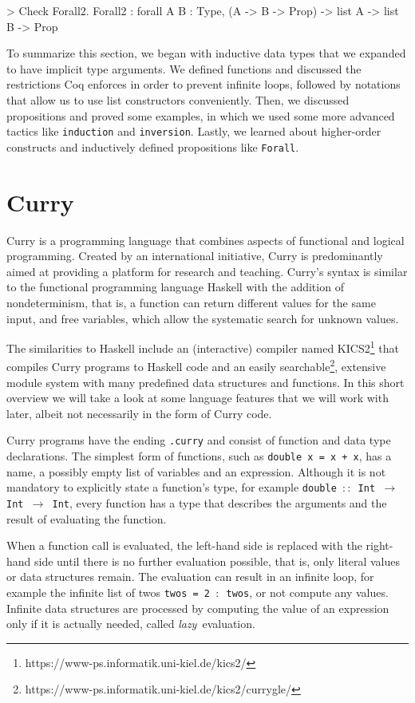 \documentclass[paper = a4, fleqn, abstract=on, twoside]{scrreprt}
\newcommand{\coqinline}[1]{\texttt{#1}}
\begin{document}
\begin{coqcode}
> Check Forall2.
Forall2 : forall A B : Type, (A -> B -> Prop) -> list A -> list B -> Prop
\end{coqcode}
To summarize this section, we began with inductive data types that we expanded to have implicit type arguments. We defined functions and discussed the restrictions Coq enforces in order to prevent infinite loops, followed by notations that allow us to use list constructors conveniently. Then, we discussed propositions and proved some examples, in which we used some more advanced tactics like \coqinline{induction} and \coqinline{inversion}. Lastly, we learned about higher-order constructs and inductively defined propositions like \coqinline{Forall}.
\section{Curry}
Curry\citet{report} is a programming language that combines aspects of functional and logical programming. Created by an international initiative, Curry is predominantly aimed at providing a platform for research and teaching. Curry's syntax is similar to the functional programming language Haskell with the addition of nondeterminism, that is, a function can return different values for the same input, and free variables, which allow the systematic search for unknown values.
\par
The similarities to Haskell include an (interactive) compiler named KICS2\footnote{https://www-ps.informatik.uni-kiel.de/kics2/} that compiles Curry programs to Haskell code and  an easily searchable\footnote{https://www-ps.informatik.uni-kiel.de/kics2/currygle/}, extensive module system with many predefined data structures and functions. In this short overview we will take a look at some language features that we will work with later, albeit not necessarily in the form of Curry code.\\
\par\noindent
Curry programs have the ending \texttt{.curry} and consist of function and data type declarations. The simplest form of functions, such as \texttt{double x = x + x}, has a name, a possibly empty list of variables and an expression. Although it is not mandatory to explicitly state a function's type, for example \texttt{double $::$ Int $\rightarrow$ Int $\rightarrow$ Int}, every function has a type that describes the arguments and the result of evaluating the function. 
\par
When a function call is evaluated, the left-hand side is replaced with the right-hand side until there is no further evaluation possible, that is, only literal values or data structures remain. The evaluation can result in an infinite loop, for example the infinite list of twos \texttt{twos = 2 $:$ twos}, or not compute any values. Infinite data structures are processed by computing the value of an expression only if it is actually needed, called \mbox{\textit{lazy} evaluation.}\\
\end{document}
